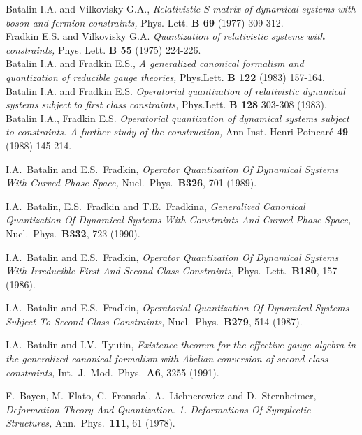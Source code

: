 \documentclass[a4paper,11pt]{amsart}
\numberwithin{thm}{section} %
\numberwithin{equation}{section} %
\numberwithin{figure}{section} %
\renewcommand{\:}{{\rm\, :\,}}
\begin{document}
\begin{thebibliography}{33}

\bibitem{[BFV]}
         Batalin I.A. and  Vilkovisky G.A.,
         {\em Relativistic S-matrix of dynamical systems with boson
         and fermion constraints,}
         Phys. Lett. {\bf B 69} (1977) 309-312.          \\
         Fradkin E.S. and Vilkovisky G.A. {\em Quantization
         of relativistic systems with
         constraints,}  Phys. Lett. {\bf B 55} (1975) 224-226.  \\
         Batalin I.A. and Fradkin E.S.,
         {\em  A generalized canonical formalism and quantization of
         reducible gauge theories,}
           Phys.Lett. {\bf B 122 }     (1983) 157-164.   \\
         Batalin I.A. and Fradkin E.S.
         {\em Operatorial quantization of relativistic dynamical systems
         subject to first class constraints,}
         Phys.Lett. {\bf B 128} 303-308 (1983).             \\
         Batalin I.A., Fradkin E.S.
         {\em Operatorial quantization of dynamical systems subject to
         constraints. A further study of the construction,}
         Ann Inst. Henri Poincar\'e  {\bf 49} (1988) 145-214.

\bibitem{[BF89]} I.A.~Batalin and E.S.~Fradkin,
{\em Operator Quantization Of Dynamical Systems
With Curved Phase Space,} Nucl.\ Phys.\ {\bf B326},
701 (1989).

\bibitem{[BFF]}
I.A.~Batalin, E.S.~Fradkin and T.E.~Fradkina,
{\em Generalized Canonical Quantization Of Dynamical Systems With
  Constraints And Curved Phase Space,}
Nucl.\ Phys.\ {\bf B332}, 723 (1990).

\bibitem{[BF]} I.A.~Batalin and E.S.~Fradkin,
{\em Operator Quantization Of Dynamical Systems With Irreducible
First And Second Class Constraints,} Phys.\ Lett.\ {\bf B180}, 157 (1986).

\bibitem{[BF87]} I.A.~Batalin and E.S.~Fradkin, {\em
Operatorial Quantization Of Dynamical Systems Subject To Second Class
Constraints,} Nucl.\ Phys.\ {\bf B279}, 514 (1987).

\bibitem{[BT]} I.A.~Batalin and I.V.~Tyutin, {\em
Existence theorem for the effective gauge algebra in the generalized
        canonical formalism with Abelian conversion of second class
        constraints,} Int.\ J.\ Mod.\ Phys.\ {\bf A6}, 3255 (1991).

\bibitem{[BFFLS]}
F.~Bayen, M.~Flato, C.~Fronsdal, A.~Lichnerowicz and D.~Sternheimer,
{\em Deformation Theory And Quantization. 1. Deformations Of Symplectic
Structures,}
Ann.\ Phys.\ {\bf 111}, 61 (1978).


\end{thebibliography}
\end{document}
